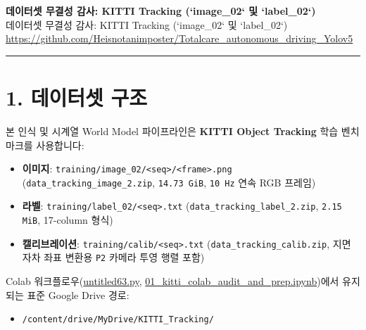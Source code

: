 \documentclass[10.5pt,a4paper]{article}
\begin{document}
\begin{center}
{\LARGE\bfseries 데이터셋 무결성 감사: KITTI Tracking (`image\_02` 및 `label\_02`)}\\[6pt]
{\normalsize\color{gray} 데이터셋 무결성 감사: KITTI Tracking (`image\_02` 및 `label\_02`)}\\[4pt]
{\small\href{https://github.com/Heisnotanimposter/Totalcare_autonomous_driving_Yolov5}{https://github.com/Heisnotanimposter/Totalcare\_autonomous\_driving\_Yolov5}}
\end{center}
\vspace{4pt}
\hrule
\vspace{8pt}

\section{1. 데이터셋 구조}

본 인식 및 시계열 World Model 파이프라인은 \textbf{KITTI Object Tracking} 학습 벤치마크를 사용합니다:

\begin{itemize}[leftmargin=1.5em,itemsep=2pt]
\item \textbf{이미지}: \texttt{training/\allowbreak{}image\_\allowbreak{}02/\allowbreak{}<seq>/\allowbreak{}<frame>.\allowbreak{}png} (\texttt{data\_\allowbreak{}tracking\_\allowbreak{}image\_\allowbreak{}2.\allowbreak{}zip}, \texttt{14.\allowbreak{}73 GiB}, \texttt{10 Hz} 연속 RGB 프레임)
\item \textbf{라벨}: \texttt{training/\allowbreak{}label\_\allowbreak{}02/\allowbreak{}<seq>.\allowbreak{}txt} (\texttt{data\_\allowbreak{}tracking\_\allowbreak{}label\_\allowbreak{}2.\allowbreak{}zip}, \texttt{2.\allowbreak{}15 MiB}, 17-column 형식)
\item \textbf{캘리브레이션}: \texttt{training/\allowbreak{}calib/\allowbreak{}<seq>.\allowbreak{}txt} (\texttt{data\_\allowbreak{}tracking\_\allowbreak{}calib.\allowbreak{}zip}, 지면 자차 좌표 변환용 \texttt{P2} 카메라 투영 행렬 포함)
\end{itemize}

Colab 워크플로우(\href{https://github.com/Heisnotanimposter/Totalcare\_autonomous\_driving\_Yolov5/blob/main/untitled63.py}{untitled63.py}, \href{https://github.com/Heisnotanimposter/Totalcare\_autonomous\_driving\_Yolov5/blob/main/colab/01\_kitti\_colab\_audit\_and\_prep.ipynb}{01\_kitti\_colab\_audit\_and\_prep.ipynb})에서 유지되는 표준 Google Drive 경로:

\begin{itemize}[leftmargin=1.5em,itemsep=2pt]
\item \texttt{/\allowbreak{}content/\allowbreak{}drive/\allowbreak{}MyDrive/\allowbreak{}KITTI\_\allowbreak{}Tracking/\allowbreak{}}
\end{itemize}
\end{document}
